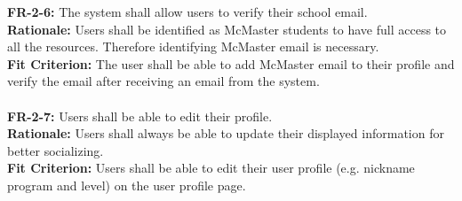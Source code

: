 \documentclass[12pt]{article}
\begin{document}
    \textbf{FR-2-6:} The system shall allow users to verify their school email.\\
    \textbf{Rationale:} Users shall be identified as McMaster students to have full access to all the resources. Therefore identifying McMaster email is necessary. \\
    \textbf{Fit Criterion:} The user shall be able to add McMaster email to their profile and verify the email after receiving an email from the system.\\\\
    \textbf{FR-2-7:} Users shall be able to edit their profile.\\
    \textbf{Rationale:} Users shall always be able to update their displayed information for better socializing.\\
    \textbf{Fit Criterion:} Users shall be able to edit their user profile (e.g. nickname program and level) on the user profile page.\\\\
\end{document}
